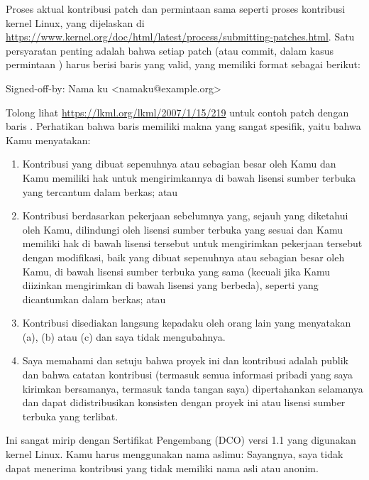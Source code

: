 Proses aktual kontribusi patch dan permintaan  sama seperti
proses kontribusi kernel Linux, yang dijelaskan di
\url{https://www.kernel.org/doc/html/latest/process/submitting-patches.html}.
Satu persyaratan penting adalah bahwa setiap patch (atau commit, dalam
kasus permintaan ) harus berisi baris  yang
valid, yang memiliki format sebagai berikut:

\begin{VerbatimU}
Signed-off-by: Nama ku <namaku@example.org>
\end{VerbatimU}

Tolong lihat \url{https://lkml.org/lkml/2007/1/15/219} untuk contoh patch
dengan baris .
Perhatikan bahwa baris  memiliki makna yang sangat
spesifik, yaitu bahwa Kamu menyatakan:

\begin{enumerate}[label={(\alph*)}]
\item 	Kontribusi yang dibuat sepenuhnya atau sebagian besar oleh Kamu
	dan Kamu memiliki hak untuk mengirimkannya di bawah lisensi
	sumber terbuka yang tercantum dalam berkas; atau
\item	Kontribusi berdasarkan pekerjaan sebelumnya yang, sejauh yang
	diketahui oleh Kamu, dilindungi oleh lisensi sumber terbuka yang
	sesuai dan Kamu memiliki hak di bawah lisensi tersebut untuk
	mengirimkan pekerjaan tersebut dengan modifikasi, baik yang
	dibuat sepenuhnya atau sebagian besar oleh Kamu, di bawah
	lisensi sumber terbuka yang sama (kecuali jika Kamu diizinkan
	mengirimkan di bawah lisensi yang berbeda), seperti yang
	dicantumkan dalam berkas; atau
\item	Kontribusi disediakan langsung kepadaku oleh orang lain yang
	menyatakan (a), (b) atau (c) dan saya tidak mengubahnya.
\item	Saya memahami dan setuju bahwa proyek ini dan kontribusi
	adalah publik dan bahwa catatan kontribusi (termasuk semua
	informasi pribadi yang saya kirimkan bersamanya, termasuk
	tanda tangan saya) dipertahankan selamanya dan dapat
	didistribusikan konsisten dengan proyek ini atau lisensi
	sumber terbuka yang terlibat.
\end{enumerate}

Ini sangat mirip dengan Sertifikat Pengembang (DCO) versi 1.1 yang
digunakan kernel Linux.
Kamu harus menggunakan nama aslimu:
Sayangnya, saya tidak dapat menerima kontribusi yang tidak memiliki nama
asli atau anonim.

